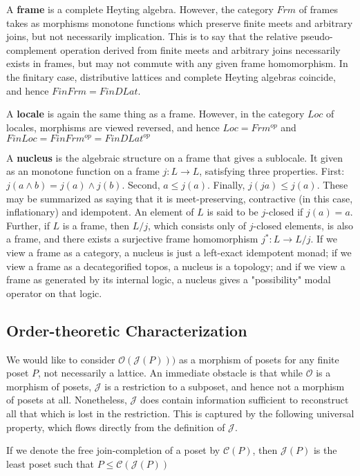 \documentclass[hoptionsi,review,format=sigplan]{acmart}
\theoremstyle{definition}
\newcommand{\Oc}{\mathcal{O}}
\newcommand{\Jc}{\mathcal{J}}
\newcommand{\Cc}{\mathcal{C}}
\begin{document}
A \textbf{frame} is a complete Heyting algebra. However, the category \(Frm\) of frames takes as morphisms monotone functions which preserve finite meets and arbitrary joins, but not necessarily implication. This is to say that the relative pseudo-complement operation derived from finite meets and arbitrary joins necessarily exists in frames, but may not commute with any given frame homomorphism. In the finitary case, distributive lattices and complete Heyting algebras coincide, and hence \(FinFrm = FinDLat\).

A \textbf{locale} is again the same thing as a frame. However, in the category \(Loc\) of locales, morphisms are viewed reversed, and hence \(Loc = Frm^{op}\) and \(FinLoc = FinFrm^{op} = FinDLat^{op}\)

A \textbf{nucleus} is the algebraic structure on a frame that gives a sublocale. It given as an monotone function on a frame \(j : L \rightarrow L\), satisfying three properties. First: \(j(a \wedge b) = j(a) \wedge j(b)\). Second, \(a \le j(a)\). Finally, \(j(ja) \le j(a)\). These may be summarized as saying that it is meet-preserving, contractive (in this case, inflationary) and idempotent. An element of \(L\) is said to be \(j\)-closed if \(j(a)=a\). Further, if \(L\) is a frame, then \(L/j\), which consists only of \(j\)-closed elements, is also a frame, and there exists a surjective frame homomorphism \(j^* : L \rightarrow L/j\). If we view a frame as a category, a nucleus is just a left-exact idempotent monad; if we view a frame as a decategorified topos, a nucleus is a topology; and if we view a frame as generated by its internal logic, a nucleus gives a "possibility" modal operator on that logic.

\subsection{Order-theoretic Characterization}

We would like to consider \(\Oc(\Jc(P)))\) as a morphism of posets for any finite poset \(P\), not necessarily a lattice. An immediate obstacle is that while \(\Oc\) is a morphism of posets, \(\Jc\) is a restriction to a subposet, and hence not a morphism of posets at all. Nonetheless, \(\Jc\) does contain information sufficient to reconstruct all that which is lost in the restriction. This is captured by the following universal property, which flows directly from the definition of \(\Jc\).

\begin{lemma}
If we denote the free join-completion of a poset by \(\Cc(P)\), then \(\Jc(P)\) is the least poset such that \(P \le \Cc(\Jc(P))\)
\end{lemma}
\end{document}

